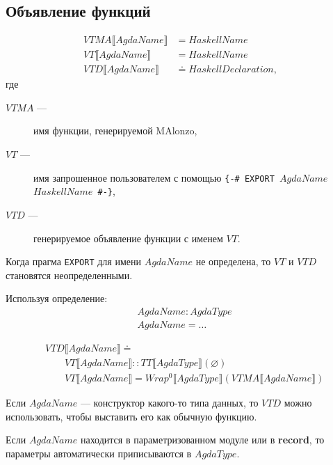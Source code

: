 \subsection{Объявление функций}
\begin{align*}
VTMA\llbracket AgdaName \rrbracket &= HaskellName\\
VT\llbracket AgdaName \rrbracket &= HaskellName\\
VTD\llbracket AgdaName \rrbracket &\doteq HaskellDeclaration,
\end{align*}
где
\begin{description}
\item[\(VTMA\) ---] имя функции, генерируемой MAlonzo,
\item[\(VT\) ---] имя запрошенное пользователем с помощью
\texttt{\{-\# EXPORT \(AgdaName\) \(HaskellName\) \#-\}},
\item[\(VTD\) ---] генерируемое объявление функции с именем \(VT\).
\end{description}

Когда прагма \texttt{EXPORT} для имени \(AgdaName\) не определена,
то \(VT\) и \(VTD\) становятся неопределенными.

Используя определение:
\begin{align*}
&AgdaName : AgdaType\\
&AgdaName = \dots
\end{align*}

\begin{align*}
&VTD\llbracket AgdaName \rrbracket \doteq\\
&\quad\quad VT\llbracket AgdaName \rrbracket :: TT\llbracket AgdaType \rrbracket
   (\varnothing)\\
&\quad\quad VT\llbracket AgdaName \rrbracket = Wrap^0\llbracket AgdaType \rrbracket
   (VTMA\llbracket AgdaName \rrbracket)
\end{align*}

Если \(AgdaName\) --- конструктор какого-то типа данных, то \(VTD\) можно использовать,
чтобы выставить его как обычную функцию.

Если \(AgdaName\) находится в параметризованном модуле или в \textbf{record}, то
параметры автоматически приписываются в \(AgdaType\).
